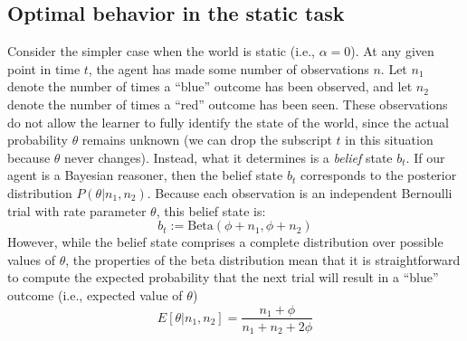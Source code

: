 \documentclass[authoryear]{elsarticle}
\begin{document}
\subsection{Optimal behavior in the static task}

Consider the simpler case when the world is static (i.e., $\alpha=0$). At any given point in time $t$, the agent has made some number of observations $n$. Let $n_1$ denote the number of times a ``blue'' outcome has been observed, and let $n_2$ denote the number of times a ``red'' outcome has been seen. These observations do not allow the learner to fully identify the state of the world, since the actual probability $\theta$ remains unknown (we can drop the subscript $t$ in this situation because $\theta$ never changes). Instead, what it determines is a {\it belief} state $b_t$. If our agent is a Bayesian reasoner, then the belief state $b_t$ corresponds to the posterior distribution $P(\theta | n_1, n_2)$. Because each observation is an independent Bernoulli trial with rate parameter $\theta$, this belief state is:
$$
b_t := \mbox{Beta}(\phi+n_1, \phi+n_2)
$$
However, while the belief state comprises a complete distribution over possible values of $\theta$, the properties of the beta distribution mean that it is straightforward to compute the expected probability that the next trial will result in a ``blue'' outcome (i.e., expected value of $\theta$)
$$
E[\theta|n_1, n_2]  = \frac{n_1 + \phi}{n_1+n_2+2\phi}
$$
\end{document}
